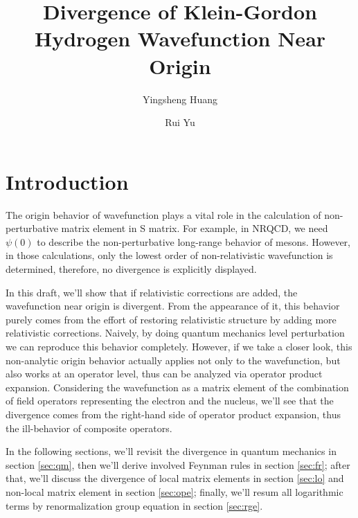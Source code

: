 \documentclass[aps,prd,preprint,showkeys,notitlepage,10pt]{revtex4-1}
\begin{document}
\title{Divergence of Klein-Gordon Hydrogen Wavefunction Near Origin}
\author{Yingsheng Huang}
\author{Rui Yu}

\begin{abstract}

\end{abstract}
\keywords{}

\maketitle

\section*{Introduction}
The origin behavior of wavefunction plays a vital role in the calculation of non-perturbative matrix element in S matrix. For example, in NRQCD, we need $\psi(0)$ to describe the non-perturbative long-range behavior of mesons. However, in those calculations, only the lowest order of non-relativistic wavefunction is determined, therefore, no divergence is explicitly displayed.

In this draft, we'll show that if relativistic corrections are added, the wavefunction near origin is divergent. From the appearance of it, this behavior purely comes from the effort of restoring relativistic structure by adding more relativistic corrections. Naively, by doing quantum mechanics level perturbation we can reproduce this behavior completely. However, if we take a closer look, this non-analytic origin behavior actually applies not only to the wavefunction, but also works at an operator level, thus can be analyzed via operator product expansion. Considering the wavefunction as a matrix element of the combination of field operators representing the electron and the nucleus, we'll see that the divergence comes from the right-hand side of operator product expansion, thus the ill-behavior of composite operators.

In the following sections, we'll revisit the divergence in quantum mechanics in section \ref{sec:qm}, then we'll derive involved Feynman rules in section \ref{sec:fr}; after that, we'll discuss the divergence of local matrix elements in section \ref{sec:lo} and non-local matrix element in section \ref{sec:ope}; finally, we'll resum all logarithmic terms by renormalization group equation in section \ref{sec:rge}.
\end{document}
